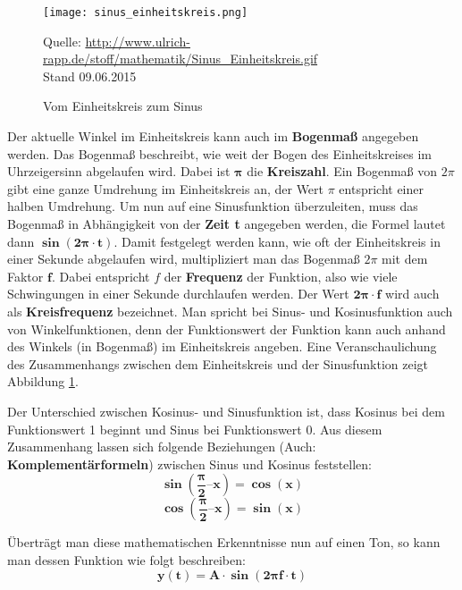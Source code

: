 \begin{figure} [ht]
\centering
\texttt{[image: sinus\_einheitskreis.png]}
\caption{Vom Einheitskreis zum Sinus}
\label{fig:unitcircleToSinus}
Quelle: \url{http://www.ulrich-rapp.de/stoff/mathematik/Sinus_Einheitskreis.gif}
\\Stand 09.06.2015
\end{figure}

Der aktuelle Winkel im Einheitskreis kann auch im \textbf{Bogenmaß} angegeben werden. Das Bogenmaß beschreibt, wie weit der Bogen des Einheitskreises im Uhrzeigersinn abgelaufen wird. Dabei ist $\bm{\pmb{\pi}}$ die \textbf{Kreiszahl}. Ein Bogenmaß von $2\pi$ gibt eine ganze Umdrehung im Einheitskreis an, der Wert $\pi$ entspricht einer halben Umdrehung. Um nun auf eine Sinusfunktion überzuleiten, muss das Bogenmaß in Abhängigkeit von der \textbf{Zeit t} angegeben werden, die Formel lautet dann $\bm{\sin(2\pmb{\pi}\cdot t)}$. Damit festgelegt werden kann, wie oft der Einheitskreis in einer Sekunde abgelaufen wird, multipliziert man das Bogenmaß $2\pi$ mit dem Faktor $\bm{f}$. Dabei entspricht $f$ der \textbf{Frequenz} der Funktion, also wie viele Schwingungen in einer Sekunde durchlaufen werden. Der Wert $\bm{2\pmb{\pi} \cdot f}$ wird auch als \textbf{Kreisfrequenz} bezeichnet.
Man spricht bei Sinus- und Kosinusfunktion auch von Winkelfunktionen, denn der Funktionswert der Funktion kann auch anhand des Winkels (in Bogenmaß) im Einheitskreis angeben. 
Eine Veranschaulichung des Zusammenhangs zwischen dem Einheitskreis und der Sinusfunktion zeigt Abbildung \ref{fig:unitcircleToSinus}.

Der Unterschied zwischen Kosinus- und Sinusfunktion ist, dass Kosinus bei dem Funktionswert 1 beginnt und Sinus bei Funktionswert 0. Aus diesem Zusammenhang lassen sich folgende Beziehungen (Auch: \textbf{Komplementärformeln}) zwischen Sinus und Kosinus feststellen:\\

\begin{equation}\bm{\sin(\frac {\pmb{\pi}}{2} – x) =\cos(x)}\end{equation}
\begin{equation}\bm{\cos(\frac {\pmb{\pi}}{2} – x) = \sin(x)}\end{equation}
\cite[s. 218]{matheBuch}

Überträgt man diese mathematischen Erkenntnisse nun auf einen Ton, so kann man dessen Funktion wie folgt beschreiben: 		\begin{equation}\bm{y(t) = A \cdot \sin(2 \pmb{\pi} f \cdot t)}\end{equation}

